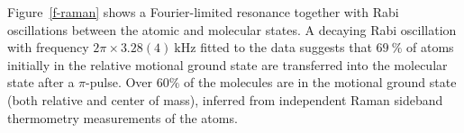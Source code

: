 \documentclass[aps,prl,twocolumn,10pt,superscriptaddress]{revtex4-1}
\begin{document}
Figure~\ref{f-raman} shows a Fourier-limited resonance together with Rabi oscillations between the atomic and molecular states.
A decaying Rabi oscillation with frequency $2\pi\times3.28(4)~\mathrm{kHz}$ fitted to the data suggests that
$69~\mathrm{\%}$ of atoms initially in the relative motional ground state are transferred into the molecular state after a $\pi$-pulse. Over $60\%$ of the molecules are in the motional ground state (both relative and center of mass), inferred from independent Raman sideband thermometry measurements of the atoms.
\end{document}
